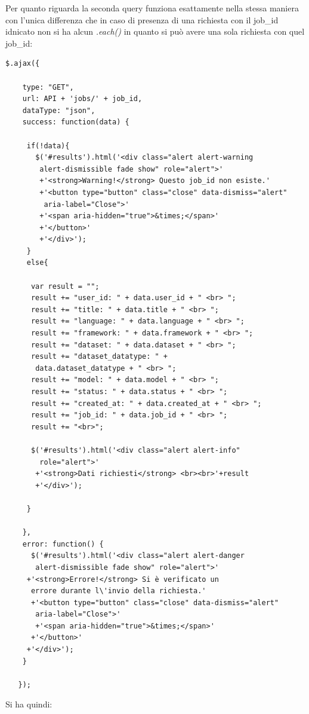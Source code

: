 \documentclass[a4paper,12pt, oneside]{book}
\begin{document}
Per quanto riguarda la seconda query funziona esattamente nella stessa maniera con
l'unica differenza che in caso di presenza di una richiesta con il job\_id idnicato
non si ha alcun \textit{.each()} in quanto si può avere una sola richiesta con quel job\_id:
\begin{shaded}
\begin{verbatim}
$.ajax({

    type: "GET",
    url: API + 'jobs/' + job_id,
    dataType: "json",
    success: function(data) {
     
     if(!data){
       $('#results').html('<div class="alert alert-warning
        alert-dismissible fade show" role="alert">'
        +'<strong>Warning!</strong> Questo job_id non esiste.'
        +'<button type="button" class="close" data-dismiss="alert"
         aria-label="Close">'
        +'<span aria-hidden="true">&times;</span>'
        +'</button>'
        +'</div>');
     }
     else{

      var result = "";
      result += "user_id: " + data.user_id + " <br> ";
      result += "title: " + data.title + " <br> ";
      result += "language: " + data.language + " <br> ";
      result += "framework: " + data.framework + " <br> ";
      result += "dataset: " + data.dataset + " <br> ";
      result += "dataset_datatype: " +
       data.dataset_datatype + " <br> ";
      result += "model: " + data.model + " <br> ";
      result += "status: " + data.status + " <br> ";
      result += "created_at: " + data.created_at + " <br> ";
      result += "job_id: " + data.job_id + " <br> ";
      result += "<br>";
  
      $('#results').html('<div class="alert alert-info"
        role="alert">'
       +'<strong>Dati richiesti</strong> <br><br>'+result
       +'</div>');

     }
 
    },
    error: function() {
      $('#results').html('<div class="alert alert-danger
       alert-dismissible fade show" role="alert">'
     +'<strong>Errore!</strong> Si è verificato un
      errore durante l\'invio della richiesta.'
      +'<button type="button" class="close" data-dismiss="alert"
       aria-label="Close">'
       +'<span aria-hidden="true">&times;</span>'
      +'</button>'
     +'</div>');
    }
 
   });
\end{verbatim}
\end{shaded}
\newpage
Si ha quindi:
\end{document}
